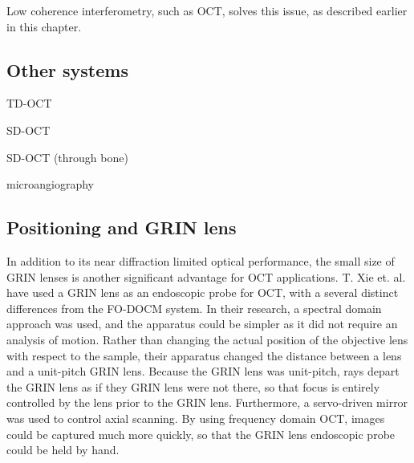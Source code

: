 Low coherence interferometry, such as OCT, solves this issue, as described earlier in this chapter. \cite{hong}

\subsection{Other systems}

TD-OCT \cite{Choudhury2006}

SD-OCT \cite{Gao2013}

SD-OCT (through bone) \cite{Choudhury2011} \cite{Subhash2012}

microangiography \cite{Dziennis2012}

\subsection{Positioning and GRIN lens}

In addition to its near diffraction limited optical performance, the small size of GRIN lenses is another significant advantage for OCT applications. T. Xie et. al. have used a GRIN lens as an endoscopic probe for OCT, with a several distinct differences from the FO-DOCM system. In their research, a spectral domain approach was used, and the apparatus could be simpler as it did not require an analysis of motion. Rather than changing the actual position of the objective lens with respect to the sample, their apparatus changed the distance between a lens and a unit-pitch GRIN lens. Because the GRIN lens was unit-pitch, rays depart the GRIN lens as if they GRIN lens were not there, so that focus is entirely controlled by the lens prior to the GRIN lens. Furthermore, a servo-driven mirror was used to control axial scanning. By using frequency domain OCT, images could be captured much more quickly, so that the GRIN lens endoscopic probe could be held by hand. \cite{Xie2006}






